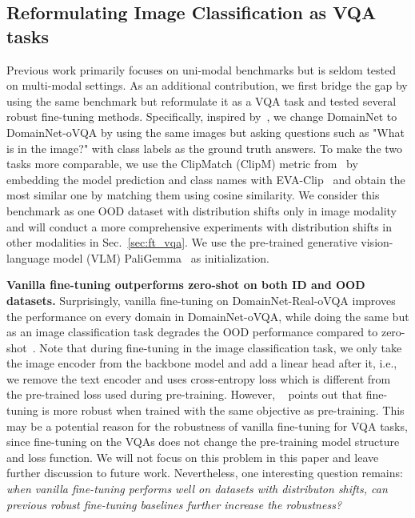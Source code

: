 

\subsection{Reformulating Image Classification as VQA tasks}
\label{sec:ref_vqa}



Previous work primarily focuses on uni-modal benchmarks but is seldom tested on multi-modal settings. As an additional contribution, we first bridge the gap by using the same benchmark but reformulate it as a VQA task and tested several robust fine-tuning methods. Specifically, inspired by~\citet{ging2024openendedvqabenchmarkingvisionlanguage}, we change DomainNet to DomainNet-oVQA by using the same images but asking questions such as "What is in the image?" with class labels as the ground truth answers. To make the two tasks more comparable, we use the ClipMatch (ClipM) metric from~\citet{ging2024openendedvqabenchmarkingvisionlanguage} by embedding the model prediction and class names with EVA-Clip~\citep{sun2023evaclipimprovedtrainingtechniques} and obtain the most similar one by matching them using cosine similarity.
We consider this benchmark as one OOD dataset with distribution shifts only in image modality and will conduct a more comprehensive experiments with distribution shifts in other modalities in Sec.~\ref{sec:ft_vqa}. We use the pre-trained generative vision-language model (VLM) PaliGemma~\citep{beyer_paligemma_2024} as initialization.



\noindent \textbf{Vanilla fine-tuning outperforms zero-shot on both ID and OOD datasets.} Surprisingly, vanilla fine-tuning on DomainNet-Real-oVQA improves the performance on every domain in DomainNet-oVQA, while doing the same but as an image classification task degrades the OOD performance compared to zero-shot~\citep{wortsman_robust_2022}. Note that during fine-tuning in the image classification task, we only take the image encoder from the backbone model and add a linear head after it, i.e., we remove the text encoder and uses cross-entropy loss which is different from the pre-trained loss used during pre-training. However, ~\citep{goyal2023finetune} points out that fine-tuning is more robust when trained with the same objective as pre-training. This may be a potential reason for the robustness of vanilla fine-tuning for VQA tasks, since fine-tuning on the VQAs does not change the pre-training model structure and loss function. We will not focus on this problem in this paper and leave further discussion to future work. Nevertheless, one interesting question remains: \textit{when vanilla fine-tuning performs well on datasets with distributon shifts, can previous robust fine-tuning baselines further increase the robustness?}

